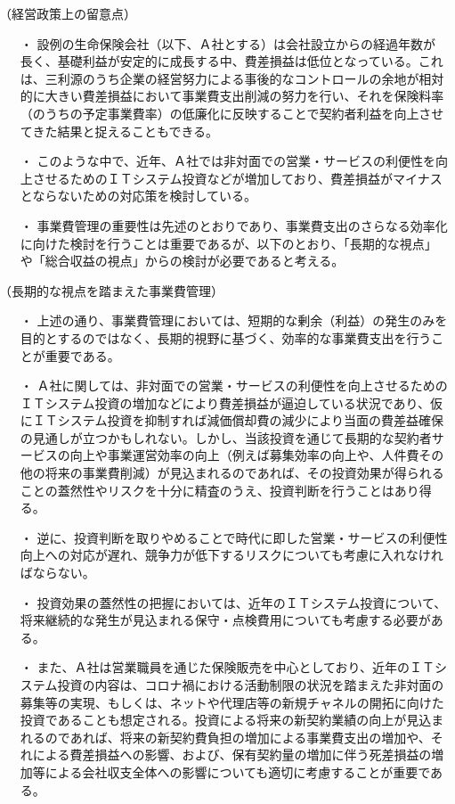 \documentclass[report,gutter=10mm,fore-edge=10mm,uplatex,dvipdfmx]{jlreq}
\begin{document}
（経営政策上の留意点）

\begin{itemize}
 \item [・]  設例の生命保険会社（以下、Ａ社とする）は会社設立からの経過年数が長く、基礎利益が安定的に成長する中、費差損益は低位となっている。これは、三利源のうち企業の経営努力による事後的なコントロールの余地が相対的に大きい費差損益において事業費支出削減の努力を行い、それを保険料率（のうちの予定事業費率）の低廉化に反映することで契約者利益を向上させてきた結果と捉えることもできる。
 \item [・]  このような中で、近年、Ａ社では非対面での営業・サービスの利便性を向上させるためのＩＴシステム投資などが増加しており、費差損益がマイナスとならないための対応策を検討している。
 \item [・]  事業費管理の重要性は先述のとおりであり、事業費支出のさらなる効率化に向けた検討を行うことは重要であるが、以下のとおり、「長期的な視点」や「総合収益の視点」からの検討が必要であると考える。
\end{itemize}

（長期的な視点を踏まえた事業費管理）

\begin{itemize}
 \item [・ ] 上述の通り、事業費管理においては、短期的な剰余（利益）の発生のみを目的とするのではなく、長期的視野に基づく、効率的な事業費支出を行うことが重要である。
 \item [・ ] Ａ社に関しては、非対面での営業・サービスの利便性を向上させるためのＩＴシステム投資の増加などにより費差損益が逼迫している状況であり、仮にＩＴシステム投資を抑制すれば減価償却費の減少により当面の費差益確保の見通しが立つかもしれない。しかし、当該投資を通じて長期的な契約者サービスの向上や事業運営効率の向上（例えば募集効率の向上や、人件費その他の将来の事業費削減）が見込まれるのであれば、その投資効果が得られることの蓋然性やリスクを十分に精査のうえ、投資判断を行うことはあり得る。
 \item [・ ] 逆に、投資判断を取りやめることで時代に即した営業・サービスの利便性向上への対応が遅れ、競争力が低下するリスクについても考慮に入れなければならない。
 \item [・ ] 投資効果の蓋然性の把握においては、近年のＩＴシステム投資について、将来継続的な発生が見込まれる保守・点検費用についても考慮する必要がある。
 \item [・ ] また、Ａ社は営業職員を通じた保険販売を中心としており、近年のＩＴシステム投資の内容は、コロナ禍における活動制限の状況を踏まえた非対面の募集等の実現、もしくは、ネットや代理店等の新規チャネルの開拓に向けた投資であることも想定される。投資による将来の新契約業績の向上が見込まれるのであれば、将来の新契約費負担の増加による事業費支出の増加や、それによる費差損益への影響、および、保有契約量の増加に伴う死差損益の増加等による会社収支全体への影響についても適切に考慮することが重要である。
\end{itemize}
\end{document}
